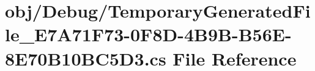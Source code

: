 \hypertarget{_debug_2_temporary_generated_file___e7_a71_f73-0_f8_d-4_b9_b-_b56_e-8_e70_b10_b_c5_d3_8cs}{
\section{obj/Debug/TemporaryGeneratedFile\_\-E7A71F73-\/0F8D-\/4B9B-\/B56E-\/8E70B10BC5D3.cs File Reference}
\label{_debug_2_temporary_generated_file___e7_a71_f73-0_f8_d-4_b9_b-_b56_e-8_e70_b10_b_c5_d3_8cs}
}
